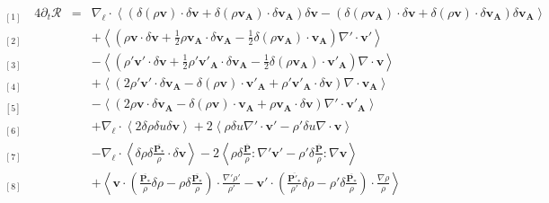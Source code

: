 \begin{equation}
\label{eq:turb_cpg_khm} \boxed{
\begin{array}{lcl}
{}_{[1]} \quad 4\partial_t \mathcal{R} &=& \nabla_{\boldsymbol{\ell}} \cdot \left<\left(\delta \left(\rho\boldsymbol{v}\right) \cdot \delta \boldsymbol{v}+ \delta \left(\rho\boldsymbol{v_A}\right) \cdot \delta \boldsymbol{v_A} \right) \delta \boldsymbol{v}  -\left(\delta \left(\rho\boldsymbol{v_A}\right) \cdot \delta \boldsymbol{v}  + \delta \left(\rho\boldsymbol{v}\right) \cdot \delta \boldsymbol{v_A}  \right) \delta \boldsymbol{v_A} \right>\\
{}_{[2]} && +\left< \left(\rho \boldsymbol{v} \cdot \delta \boldsymbol{v} +\frac{1}{2} \rho \boldsymbol{v_A} \cdot  \delta \boldsymbol{v_A} -\frac{1}{2} \delta \left(\rho \boldsymbol{v_A}\right) \cdot \boldsymbol{v_A} \right) \nabla' \cdot \boldsymbol{v'} \right>\\
{}_{[3]} && -\left< \left(\rho' \boldsymbol{v'} \cdot \delta \boldsymbol{v}  + \frac{1}{2} \rho' \boldsymbol{v'_A} \cdot \delta \boldsymbol{v_A}  - \frac{1}{2} \delta \left(\rho \boldsymbol{v_A}\right) \cdot \boldsymbol{v'_A}  \right)\nabla \cdot \boldsymbol{v}\right>\\
{}_{[4]} &&+ \left<\left(2 \rho' \boldsymbol{v'} \cdot \delta \boldsymbol{v_A}- \delta \left(\rho \boldsymbol{v}\right) \cdot \boldsymbol{v'_A} + \rho' \boldsymbol{v'_A} \cdot \delta \boldsymbol{v}  \right)\nabla \cdot \boldsymbol{v_A}\right>\\
{}_{[5]} &&- \left<\left(2\rho \boldsymbol{v} \cdot \delta \boldsymbol{v_A} - \delta \left(\rho \boldsymbol{v}\right) \cdot \boldsymbol{v_A} +  \rho \boldsymbol{v_A} \cdot \delta \boldsymbol{v} \right)\nabla' \cdot \boldsymbol{v'_A}\right> \\
{}_{[6]} &&+ \nabla_{\boldsymbol{\ell}} \cdot \left< 2\delta \rho  \delta u \delta \boldsymbol{v}\right> + 2\left<\rho \delta u \nabla' \cdot \boldsymbol{v'}- \rho' \delta u \nabla \cdot \boldsymbol{v}\right>\\
{}_{[7]} &&- \nabla_{\boldsymbol{\ell}} \cdot \left<\delta \rho \delta \frac{ \overline{\boldsymbol{P_*}} }{\rho} \cdot \delta \boldsymbol{v} \right> - 2\left<\rho \delta \frac{ \overline{\boldsymbol{P}} }{\rho}:\nabla' \boldsymbol{v'} -  \rho' \delta \frac{ \overline{\boldsymbol{P}} }{\rho} :\nabla  \boldsymbol{v} \right>\\
{}_{[8]} && +  \left< \boldsymbol{v} \cdot \left(  \frac{ \overline{\boldsymbol{P_*}} }{\rho} \delta \rho - \rho \delta \frac{ \overline{\boldsymbol{P_*}} }{\rho}  \right)\cdot  \frac{\nabla' \rho'}{\rho'} - \boldsymbol{v'} \cdot \left(  \frac{ \overline{\boldsymbol{P'_*}} }{\rho'} \delta \rho - \rho' \delta \frac{ \overline{\boldsymbol{P_*}} }{\rho}  \right)\cdot  \frac{\nabla \rho}{\rho}  \right>\\

\end{array}}
\end{equation}
